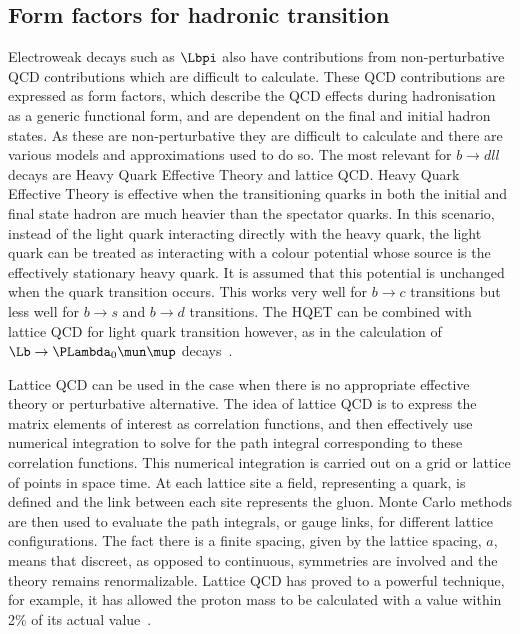 \subsection{Form factors for hadronic transition}
\label{subsec:ff}
Electroweak decays such as $\Lbpi$ also have contributions from non-perturbative QCD contributions which are difficult to calculate. These QCD contributions are expressed as form factors,  which describe the QCD effects during hadronisation as a generic functional form, and are dependent on the final and initial hadron states. As these are non-perturbative they are difficult to calculate and there are various models and approximations used to do so. The most relevant for $b\to dll$ decays are Heavy Quark Effective Theory and lattice QCD. Heavy Quark Effective Theory is effective when the transitioning quarks in both the initial and final state hadron are much heavier than the spectator quarks. In this scenario, instead of the light quark interacting directly with the heavy quark, the light quark can be treated as interacting with a colour potential whose source is the effectively stationary heavy quark. It is assumed that this potential is unchanged when the quark transition occurs. This works very well for $b\to c$ transitions but less well for $b\to s $ and $b\to d$ transitions. The HQET can be combined with lattice QCD for light quark transition however, as in the calculation of $\Lb\to\PLambda_{0}\mun\mup$ decays~\cite{Meinel}.%

Lattice QCD can be used in the case when there is no appropriate effective theory or perturbative alternative. The idea of lattice QCD is to express the matrix elements of interest as correlation functions, and then effectively use numerical integration to solve for the path integral corresponding to these correlation functions. This numerical integration is carried out on a grid or lattice of points in space time. At each lattice site a field, representing a quark, is defined and the link between each site represents the gluon. Monte Carlo methods are then used to evaluate the path integrals, or gauge links, for different lattice configurations. The fact there is a finite spacing, given by the lattice spacing, $a$, means that discreet, as opposed to continuous, symmetries are involved and the theory remains renormalizable. Lattice QCD has proved to a powerful technique, for example,  it has allowed the proton mass to be calculated with a value within 2\% of its actual value~\cite{proton}.


